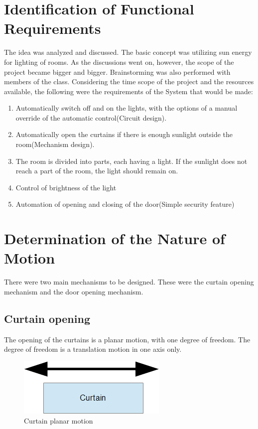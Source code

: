 \documentclass[oneside,notitlepage]{book}
\begin{document}
\section{Identification of Functional Requirements}
The idea was analyzed and discussed. The basic concept was utilizing sun energy for lighting of rooms. As the discussions went on, however, the scope of the project became bigger and bigger. Brainstorming was also performed with members of the class. Considering the time scope of the project and the resources available, the following were the requirements of the System that would be made:
\begin{enumerate}

\item Automatically switch off and on the lights, with the options of a manual override of the automatic control(Circuit design).
\item Automatically open the curtains if there is enough sunlight outside the room(Mechanism design).
\item The room is divided into parts, each having a light. If the sunlight does not reach a part of the room, the light should remain on.
\item Control of brightness of the light
\item Automation of opening and closing of the door(Simple security feature)

\end{enumerate}

\section{Determination of the Nature of Motion}
There were two main mechanisms to be designed. These were the curtain opening mechanism and the door opening mechanism.
\subsection{Curtain opening}
The opening of the curtains is a planar motion, with one degree of freedom. The degree of freedom is a translation motion in one axis only.
\begin{figure}[h!tb]
\includegraphics{curtainanalysis.png}
\caption{Curtain planar motion}
\end{figure}
\end{document}
